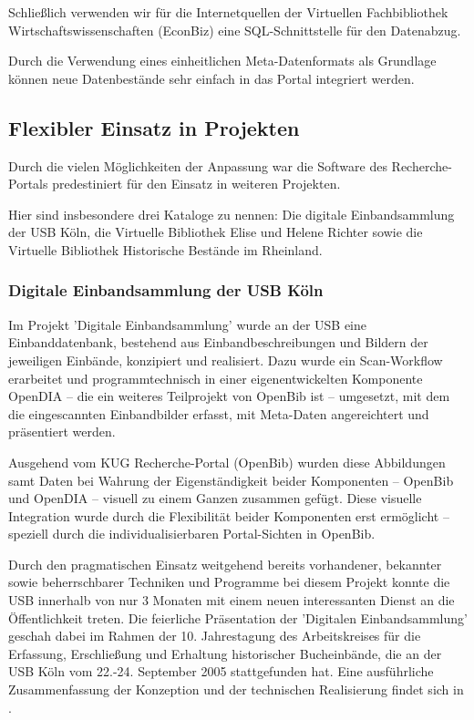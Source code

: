 \documentclass[11pt, twoside, a4paper, BCOR8mm, DIV12, bibtotoc,idxtotoc]{scrbook}
\begin{document}
Schließlich verwenden wir für die Internetquellen der Virtuellen
Fachbibliothek Wirtschafts\-wissen\-schaften (EconBiz) eine
SQL-Schnittstelle für den Datenabzug.

Durch die Verwendung eines einheitlichen Meta-Datenformats als
Grundlage können neue Daten\-be\-stän\-de sehr einfach in das Portal
integriert werden.


\subsection{Flexibler Einsatz in Projekten}

Durch die vielen Möglichkeiten der Anpassung war die Software des
Recherche-Portals predestiniert für den Einsatz in weiteren
Projekten\cite{FlimmHoffJB:06}.

Hier sind insbesondere drei Kataloge zu nennen: Die digitale
Einbandsammlung der USB Köln, die Virtuelle Bibliothek Elise und
Helene Richter sowie die Virtuelle Bibliothek Historische Bestände im
Rheinland.


\subsubsection{Digitale Einbandsammlung der USB Köln}

Im Projekt 'Digitale Einbandsammlung' wurde an der USB eine
Einbanddatenbank, bestehend aus Einbandbeschreibungen und Bildern der
jeweiligen Einbände, konzipiert und realisiert. Dazu wurde ein
Scan-Workflow erarbeitet und programmtechnisch in einer
eigenentwickelten Kom\-po\-nen\-te OpenDIA -- die ein weiteres Teilprojekt
von OpenBib ist -- umgesetzt, mit dem die eingescannten Einbandbilder
erfasst, mit Meta-Daten angereichtert und präsentiert werden.

Ausgehend vom KUG Recherche-Portal (OpenBib) wurden diese Abbildungen
samt Daten bei Wahrung der Eigenständigkeit beider Kom\-po\-nen\-ten --
OpenBib und OpenDIA -- visuell zu einem Ganzen zusammen gefügt. Diese
visuelle Integration wurde durch die Flexibilität beider Kom\-po\-nen\-ten
erst ermöglicht -- speziell durch die individualisierbaren
Portal-Sichten in OpenBib. 

Durch den pragmatischen Einsatz weitgehend bereits vorhandener,
bekannter sowie beherrschbarer Techniken und Programme bei diesem
Projekt konnte die USB innerhalb von nur 3 Monaten mit einem neuen
interessanten Dienst an die Öffentlichkeit treten. Die feierliche
Präsentation der 'Digitalen Einbandsammlung' geschah dabei im Rahmen
der 10.  Jahrestagung des Arbeitskreises für die Erfassung,
Erschließung und Erhaltung historischer Bucheinbände, die an der USB
Köln vom 22.-24.  September 2005 stattgefunden hat.  Eine
ausführliche Zusammenfassung der Kon\-zep\-tion und der technischen
Realisierung findet sich in \cite{BoeFli:EinbandDB}.
\end{document}
